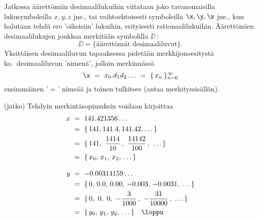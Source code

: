 Jatkossa äärettömiin desimaalilukuihin viitataan joko tavanomaisilla lukusymboleilla
$x,y,z$ jne., tai vaihtoehtoisesti symboleilla $\x,\y,\z$ jne., kun halutaan tehdä ero 
'oikeisiin' lukuihin, erityisesti rationaalilukuihin. Äärettömien desimaalilukujen joukkoa
merkitään symbolilla $\DD\,$:
\[
\DD = \{\text{äärettömät desimaaliluvut}\}.
\]
Yksittäisen desimaaliluvun tapauksessa pidetään merkkijonoesitystä ko.\ desimaaliluvun 
'nimenä', jolloin merkinnässä
\[
\x\ =\ x_0. d_1 d_2 \ldots\ =\ \{\,x_n\,\}_{n=0}^{\infty} 
\]
ensimmäinen '$=$' nimeää ja toinen tulkitsee (antaa merkityssisällön).
\jatko  \begin{Exa} (jatko) Tehdyin merkintäsopimuksin voidaan kirjoittaa
\begin{align*}
x\ &=\ 141.421356 \ldots \\ 
   &=\ \{\,141,141.4,141.42, \ldots\,\} \\
   &=\ \{\,141,\ \dfrac{1414}{10}\,,\ \dfrac{14142}{100}\,,\ \ldots\,\} \\
   &=\ \{\,x_0,\,x_1,\,x_2,\,\ldots\,\} \\[3mm]
y\ &=\ -0.00314159 \ldots \\
   &=\ \{\,0,\,0.0,\,0.00,\,-0.003,\,-0.0031,\, \ldots\,\} \\
   &=\ \{\,0,\ 0,\ 0,\ -\dfrac{3}{1000}\,,\ -\dfrac{31}{10000}\,,\ \ldots\,\} \\
   &=\ \{\,y_0,\,y_1,\,y_2,\,\ldots\,\} \quad \loppu
\end{align*}
\end{Exa}

